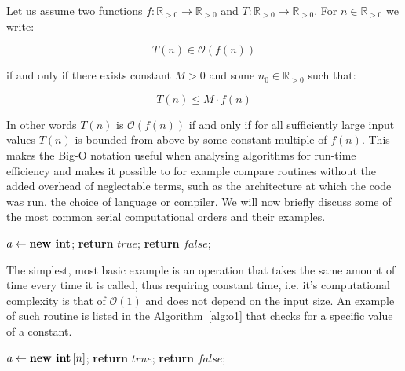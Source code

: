 \begin{definition}
Let us assume two functions $f:\mathbb{R}_{>0}\rightarrow\mathbb{R}_{>0}$ and $T:\mathbb{R}_{>0}\rightarrow\mathbb{R}_{>0}$. 
For $n \in \mathbb{R}_{>0}$ we write:

\begin{equation}
T(n) \in \mathcal{O}\left(f(n)\right)
\label{eq:bigOh}
\end{equation}

\noindent
if and only if there exists constant $M>0$ and some $n_0 \in \mathbb{R}_{>0}$ such that:

\begin{equation}
T(n)\leq M \cdot f(n)
\end{equation}
\end{definition}


In other words $T(n)$ is $\mathcal{O}\left(f(n)\right)$ if and only if for all sufficiently large input values $T(n)$ is bounded from above by some constant multiple of $f(n)$.
This makes the Big-O notation useful when analysing algorithms for run-time efficiency and makes it possible to for example compare routines without the added overhead of neglectable terms, such as the architecture at which the code was run, the choice of language or compiler.
We will now briefly discuss some of the most common serial computational orders and their examples. 

\begin{algorithm}[H]
\centering
\begin{algorithmic}[1]
\State $a \gets \text{\textbf{new int}}$;
%
%
\State \textbf{return} $true$;
%
\Else 
%
\State \textbf{return} $false$;
%
\EndIf
\end{algorithmic}
\caption{
{ \footnotesize 
{\bf Single test operation.} 
} %
}
\label{alg:o1}
\end{algorithm}

The simplest, most basic example is an operation that takes the same amount of time every time it is called, thus requiring constant time, i.e. it's computational complexity is that of $\mathcal{O}\left(1\right)$ and does not depend on the input size.
An example of such routine is listed in the Algorithm~\ref{alg:o1} that checks for a specific value of a constant.

\begin{algorithm}[H]
\centering
\begin{algorithmic}[1]
\State $a \gets \text{\textbf{new int}}\left[n\right]$;
%
%
%
\State \textbf{return} $true$;
%
\Else 
%
\State \textbf{return} $false$;
%
\EndIf
%
\EndFor
\end{algorithmic}
\caption{
{ \footnotesize 
{\bf Search for a value.} 
}%
}
\label{alg:on}
\end{algorithm}

